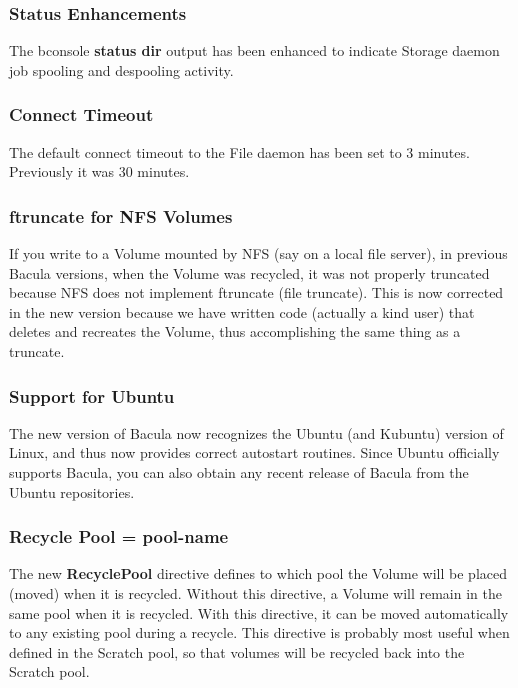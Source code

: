 \subsubsection{Status Enhancements}
The bconsole {\bf status dir} output has been enhanced to indicate
Storage daemon job spooling and despooling activity.

\subsubsection{Connect Timeout}
The default connect timeout to the File
daemon has been set to 3 minutes. Previously it was 30 minutes.

\subsubsection{ftruncate for NFS Volumes}
If you write to a Volume mounted by NFS (say on a local file server),
in previous Bacula versions, when the Volume was recycled, it was not
properly truncated because NFS does not implement ftruncate (file 
truncate). This is now corrected in the new version because we have
written code (actually a kind user) that deletes and recreates the Volume,
thus accomplishing the same thing as a truncate.

\subsubsection{Support for Ubuntu}
The new version of Bacula now recognizes the Ubuntu (and Kubuntu)
version of Linux, and thus now provides correct autostart routines.
Since Ubuntu officially supports Bacula, you can also obtain any
recent release of Bacula from the Ubuntu repositories.

\subsubsection{Recycle Pool = \lt{}pool-name\gt{}}
The new \textbf{RecyclePool} directive defines to which pool the Volume will
be placed (moved) when it is recycled. Without this directive, a Volume will
remain in the same pool when it is recycled. With this directive, it can be
moved automatically to any existing pool during a recycle. This directive is
probably most useful when defined in the Scratch pool, so that volumes will
be recycled back into the Scratch pool.


